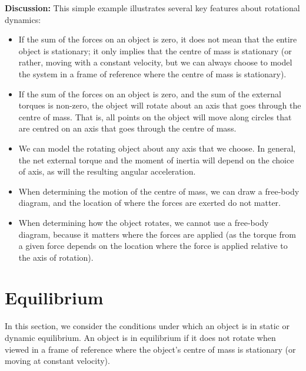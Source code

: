\begin{example}
\textbf{Discussion: }This simple example illustrates several key features about rotational dynamics:
\begin{itemize}
\item If the sum of the forces on an object is zero, it does not mean that the entire object is stationary; it only implies that the centre of mass is stationary (or rather, moving with a constant velocity, but we can always choose to model the system in a frame of reference where the centre of mass is stationary).
\item If the sum of the forces on an object is zero, and the sum of the external torques is non-zero, the object will rotate about an axis that goes through the centre of mass. That is, all points on the object will move along circles that are centred on an axis that goes through the centre of mass. 
\item We can model the rotating object about any axis that we choose. In general, the net external torque and the moment of inertia will depend on the choice of axis, as will the resulting angular acceleration. 
\item When determining the motion of the centre of mass, we can draw a free-body diagram, and the location of where the forces are exerted do not matter.
\item When determining how the object rotates, we cannot use a free-body diagram, because it matters where the forces are applied (as the torque from a given force depends on the location where the force is applied relative to the axis of rotation).
\end{itemize}
\end{example}

\section{Equilibrium}
In this section, we consider the conditions under which an object is in static or dynamic equilibrium. An object is in equilibrium if it does not rotate when viewed in a frame of reference where the object's centre of mass is stationary (or moving at constant velocity).
